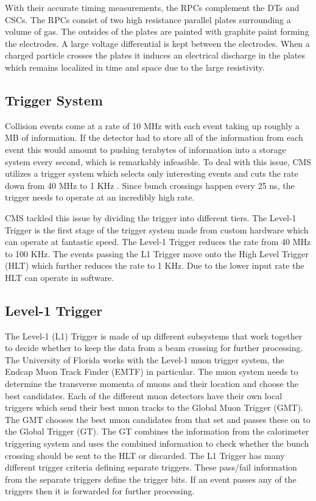 With their accurate timing measurements, the RPCs complement the DTs and CSCs. The RPCs consist of two high resistance parallel plates surrounding a volume of gas. The outsides of the plates are painted with graphite paint forming the electrodes. A large voltage differential is kept between the electrodes. When a charged particle crosses the plates it induces an electrical discharge in the plates which remains localized in time and space due to the large resistivity.

\subsection{Trigger System}
Collision events come at a rate of 10 MHz with each event taking up roughly a MB of information. If the detector had to store all of the information from each event this would amount to pushing terabytes of information into a storage system every second, which is remarkably infeasible. To deal with this issue, CMS utilizes a trigger system which selects only interesting events and cuts the rate down from 40 MHz to 1 KHz \cite{cmsexp}. Since bunch crossings happen every 25 ns, the trigger needs to operate at an incredibly high rate.

CMS tackled this issue by dividing the trigger into different tiers. The Level-1 Trigger is the first stage of the trigger system made from custom hardware which can operate at fantastic speed. The Level-1 Trigger reduces the rate from 40 MHz to 100 KHz. The events passing the L1 Trigger move onto the High Level Trigger (HLT) which further reduces the rate to 1 KHz. Due to the lower input rate the HLT can operate in software.

\subsection{Level-1 Trigger}

The Level-1 (L1) Trigger is made of up different subsystems that work together to decide whether to keep the data from a beam crossing for further processing. The University of Florida works with the Level-1 muon trigger system, the Endcap Muon Track Finder (EMTF) in particular. The muon system needs to determine the transverse momenta of muons and their location and choose the best candidates. Each of the different muon detectors have their own local triggers which send their best muon tracks to the Global Muon Trigger (GMT). The GMT chooses the best muon candidates from that set and passes these on to the Global Trigger (GT). The GT combines the information from the calorimeter triggering system and uses the combined information to check whether the bunch crossing should be sent to the HLT or discarded. The L1 Trigger has many different trigger criteria defining separate triggers. These pass/fail information from the separate triggers define the trigger bits. If an event passes any of the triggers then it is forwarded for further processing.

